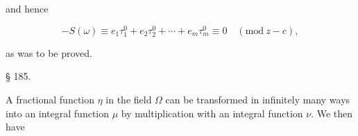 
and hence

\[ -S(\omega) \equiv e_1\tau_1^0 + e_2\tau_2^0 + \cdots + e_m\tau_m^0 \equiv 0 \quad (\mathrm{mod}\ z-c), \]

as was to be proved.

\begin{center}
§ 185. \textbf{}
\end{center}

A fractional function $\eta$ in the field $\Omega$ can be transformed in
infinitely many ways into an integral function $\mu$ by multiplication
with an integral function $\nu$. We then have
